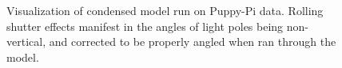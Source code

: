 \begin{figure}[h!]
    \caption{
    Visualization of condensed model run on Puppy-Pi data. Rolling shutter effects manifest in the angles of light poles being non-vertical, and corrected to be properly angled when ran through the model.
    }
    \label{fig:puppy}
\end{figure}